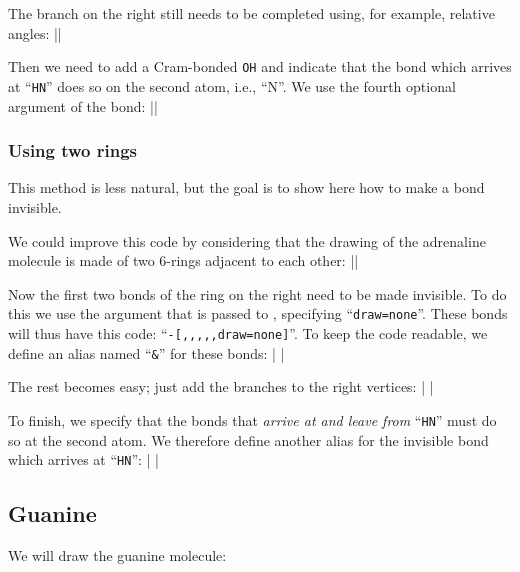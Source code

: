 \documentclass[10pt]{article}
\begin{document}
The branch on the right still needs to be completed using, for example, relative angles:
||

Then we need to add a Cram-bonded \verb-OH- and indicate that the bond which arrives at ``\verb-HN-'' does so on the second atom, i.e., ``N''. We use the fourth optional argument of the bond:
||

\subsubsection{Using two rings}
This method is less natural, but the goal is to show here how to make a bond invisible.

We could improve this code by considering that the drawing of the adrenaline molecule is made of two 6-rings adjacent to each other:
||

Now the first two bonds of the ring on the right need to be made invisible. To do this we use the argument that is passed to \TIKZ, specifying ``\verb-draw=none-''. These bonds will thus have this code: ``\verb/-[,,,,,draw=none]/''. To keep the code readable, we define an alias named ``\verb-&-'' for these bonds:
|
|

The rest becomes easy; just add the branches to the right vertices:
|
|

To finish, we specify that the bonds that \emph{arrive at and leave from} ``\verb-HN-'' must do so at the second atom. We therefore define another alias for the invisible bond which arrives at ``\verb-HN-'':
|
|

\subsection{Guanine}
We will draw the guanine molecule:
\medskip
\end{document}
